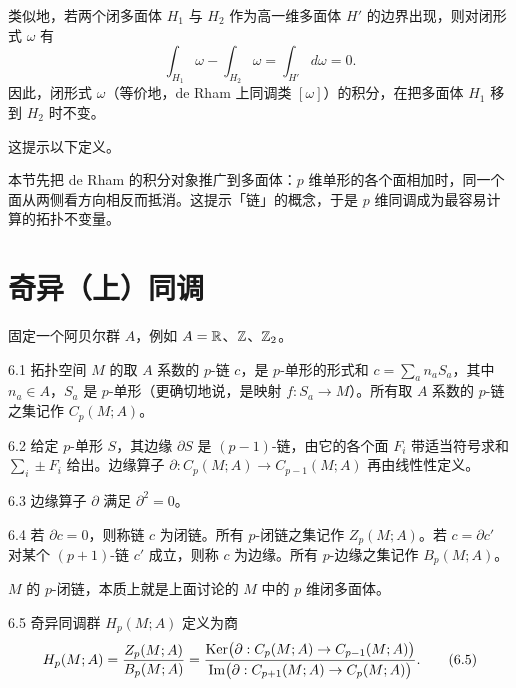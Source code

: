 类似地，若两个闭多面体 $H_1$ 与 $H_2$ 作为高一维多面体 $H'$ 的边界出现，则对闭形式 $\omega$ 有
\begin{equation}
  \int_{H_1}\omega-\int_{H_2}\omega=\int_{H'}d\omega=0.
  \tag{6.4}
\end{equation}
因此，闭形式 $\omega$（等价地，de Rham 上同调类 $[\omega]$）的积分，在把多面体 $H_1$ 移到 $H_2$ 时不变。

这提示以下定义。


本节先把 de Rham 的积分对象推广到多面体：$p$ 维单形的各个面相加时，同一个面从两侧看方向相反而抵消。这提示「链」的概念，于是 $p$ 维同调成为最容易计算的拓扑不变量。

\section{奇异（上）同调}

固定一个阿贝尔群 $A$，例如 $A=\mathbb{R}$、$\mathbb{Z}$、$\mathbb{Z}_2$。

\begin{definition}{6.1}
  拓扑空间 $M$ 的取 $A$ 系数的 $p$-链 $c$，是 $p$-单形的形式和 $c=\sum_an_aS_a$，其中 $n_a\in A$，$S_a$ 是 $p$-单形（更确切地说，是映射 $f:S_a\to M$）。所有取 $A$ 系数的 $p$-链之集记作 $C_p(M;A)$。
\end{definition}

\begin{definition}{6.2}
  给定 $p$-单形 $S$，其边缘 $\partial S$ 是 $(p-1)$-链，由它的各个面 $F_i$ 带适当符号求和 $\sum_i\pm F_i$ 给出。边缘算子 $\partial:C_p(M;A)\to C_{p-1}(M;A)$ 再由线性性定义。
\end{definition}

\begin{proposition}{6.3}
  边缘算子 $\partial$ 满足 $\partial^2=0$。
\end{proposition}

\begin{definition}{6.4}
  若 $\partial c=0$，则称链 $c$ 为闭链。所有 $p$-闭链之集记作 $Z_p(M;A)$。若 $c=\partial c'$ 对某个 $(p+1)$-链 $c'$ 成立，则称 $c$ 为边缘。所有 $p$-边缘之集记作 $B_p(M;A)$。
\end{definition}

$M$ 的 $p$-闭链，本质上就是上面讨论的 $M$ 中的 $p$ 维闭多面体。

\begin{definition}{6.5}
  奇异同调群 $H_p(M;A)$ 定义为商
  \begin{equation}
    H_p(M;A)=\frac{Z_p(M;A)}{B_p(M;A)}
    =\frac{\operatorname{Ker}\bigl(\partial:C_p(M;A)\to C_{p-1}(M;A)\bigr)}
    {\operatorname{Im}\bigl(\partial:C_{p+1}(M;A)\to C_p(M;A)\bigr)}.
    \tag{6.5}
  \end{equation}
\end{definition}

